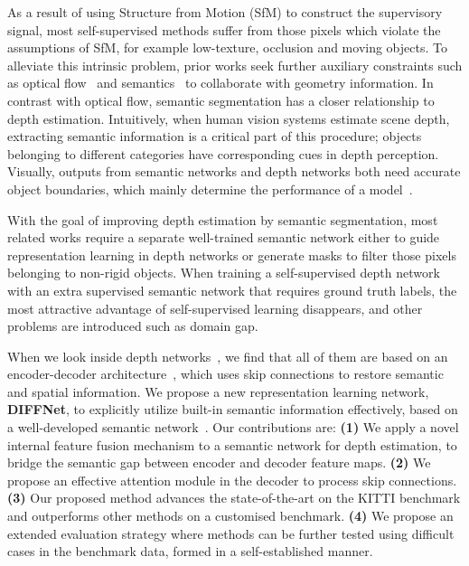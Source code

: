 \documentclass{bmvc2k}
\begin{document}
As a result of using Structure from Motion (SfM) to construct the supervisory signal, most self-supervised methods suffer from those pixels which violate the assumptions of SfM, for example low-texture, occlusion and moving objects. To alleviate this intrinsic problem, prior works seek further auxiliary constraints such as optical flow~\cite{chen2020} and semantics~\cite{kendall2018multi, Zhu_2020_CVPR} to collaborate with geometry information. In contrast with optical flow, semantic segmentation has a closer relationship to depth estimation. Intuitively, when human vision systems estimate scene depth, extracting semantic information is a critical part of this procedure; objects belonging to different categories have corresponding cues in depth perception. Visually, outputs from semantic networks and depth networks both need accurate object boundaries, which mainly determine the performance of a model~\cite{lyu2020hr}.

With the goal of improving depth estimation by semantic segmentation, most related works \cite{chen2019towards, kumar2021syndistnet, klingner2020self, choi2020safenet} require a separate well-trained semantic network either to guide representation learning in depth networks or generate masks to filter those pixels belonging to non-rigid objects. When training a self-supervised depth network with an extra supervised semantic network that requires ground truth labels, the most attractive advantage of self-supervised learning disappears, and other problems are introduced such as domain gap.

When we look inside depth networks~\cite{zhou_sfmlearner, monodepth2}, we find that all of them are based on an encoder-decoder architecture~\cite{u-net}, which uses skip connections to restore semantic and spatial information.
We propose a new representation learning network, \textbf{DIFFNet}, to explicitly utilize built-in semantic information effectively, based on a well-developed semantic network~\cite{hrnet2020}.
Our contributions are:
\textbf{(1)} We apply a novel internal feature fusion mechanism to a semantic network for depth estimation, to bridge the semantic gap between encoder and decoder feature maps.
\textbf{(2)} We propose an effective attention module in the decoder to process skip connections. 
\textbf{(3)} Our proposed method advances the state-of-the-art on the KITTI benchmark and outperforms other methods on a customised benchmark.
\textbf{(4)} We propose an extended evaluation strategy where methods can be further tested using difficult cases in the benchmark data, formed in a self-established manner.
\end{document}
